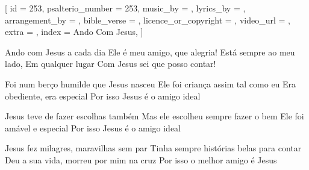 [
    id                     = {253},
    psalterio_number       = {253},
    music_by               = {},
    lyrics_by              = {},
    arrangement_by         = {},
    bible_verse            = {},
    licence_or_copyright   = {},
    video_url              = {},
    extra                  = {},
    index                  = {Ando Com Jesus},
]


\beginverse
Ando com Jesus a cada dia 
Ele é meu amigo, que alegria!
Está sempre ao meu lado, 
Em qualquer lugar
Com Jesus sei que posso contar!
\endverse


\beginverse
Foi num berço humilde que Jesus nasceu
Ele foi criança assim tal como eu
Era obediente, era especial
Por isso Jesus é o amigo ideal
\endverse


\beginverse
Jesus teve de fazer escolhas também
Mas ele escolheu sempre fazer o bem
Ele foi amável e especial
Por isso Jesus é o amigo ideal
\endverse


\beginverse
Jesus fez milagres, maravilhas sem par
Tinha sempre histórias belas para contar
Deu a sua vida, morreu por mim na cruz
Por isso o melhor amigo é Jesus
\endverse

\endsong
